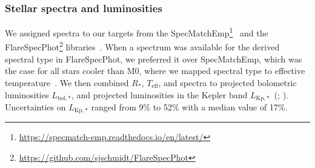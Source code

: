 \documentclass{aa}
\begin{document}
\subsubsection{Stellar spectra and luminosities}
\label{sec:lum}
We assigned spectra to our targets from the SpecMatchEmp\footnote{\url{https://specmatch-emp.readthedocs.io/en/latest/}}~\citep{yee_specmatch_2017} and the FlareSpecPhot\footnote{\url{https://github.com/sjschmidt/FlareSpecPhot}} libraries~\citep{Kirkpatrick2010, Burgasser2007, Burgasser2008, Burgasser2010, Burgasser2004, Cruz2004, Burgasser2006, Rayner2009, Doi2010, Filippazzo2015, Cruz2003, West2011, Bochanski2010,  Bochanski2007, Schmidt2010, schmidt2015, Schmidt2014a, Schmidt2014b, mann_how_2015}. When a spectrum was available for the derived spectral type in FlareSpecPhot, we preferred it over SpecMatchEmp, which was the case for all stars cooler than M0, where we mapped spectral type to effective temperature~\citep{pecaut_intrinsic_2013}. We then combined $R_*$, $T_\mathrm{eff}$, and spectra to projected bolometric luminosities $L_{\mathrm{bol,*}}$, and projected luminosities in the Kepler band $L_{\mathrm{Kp,*}}$~(\citealt{shibayama2013}; ). Uncertainties on $L_{\mathrm{Kp,*}}$ ranged from 9\;\% to 52\;\% with a median value of 17\;\%.
\end{document}

